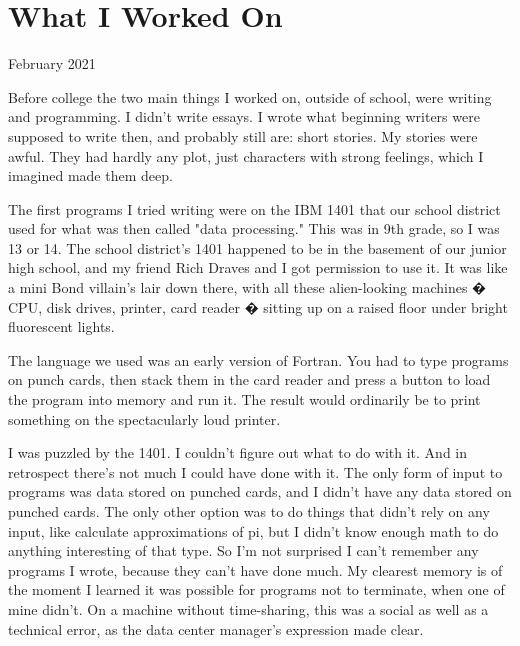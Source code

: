 \chapter{What I Worked On}


            
              
                

February 2021

Before college the two main things I
                  worked on, outside of school, were writing and programming. I
                  didn't write essays. I wrote what beginning writers were
                  supposed to write then, and probably still are: short stories.
                  My stories were awful. They had hardly any plot, just
                  characters with strong feelings, which I imagined made them
                  deep.

The first programs I tried writing were on
                  the IBM 1401 that our school district used for what was then
                  called "data processing." This was in 9th grade, so I was 13
                  or 14. The school district's 1401 happened to be in the
                  basement of our junior high school, and my friend Rich Draves
                  and I got permission to use it. It was like a mini Bond
                  villain's lair down there, with all these alien-looking
                  machines � CPU, disk drives, printer, card reader � sitting up
                  on a raised floor under bright fluorescent lights.

The
                  language we used was an early version of Fortran. You had to
                  type programs on punch cards, then stack them in the card
                  reader and press a button to load the program into memory and
                  run it. The result would ordinarily be to print something on
                  the spectacularly loud printer.

I was puzzled by
                  the 1401. I couldn't figure out what to do with it. And in
                  retrospect there's not much I could have done with it. The
                  only form of input to programs was data stored on punched
                  cards, and I didn't have any data stored on punched cards. The
                  only other option was to do things that didn't rely on any
                  input, like calculate approximations of pi, but I didn't know
                  enough math to do anything interesting of that type. So I'm
                  not surprised I can't remember any programs I wrote, because
                  they can't have done much. My clearest memory is of the moment
                  I learned it was possible for programs not to terminate, when
                  one of mine didn't. On a machine without time-sharing, this
                  was a social as well as a technical error, as the data center
                  manager's expression made clear.

